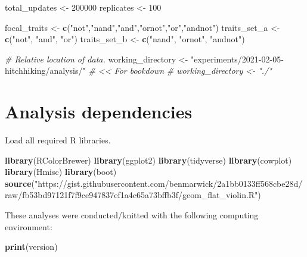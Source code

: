 \documentclass[]{book}
\newenvironment{Shaded}{\begin{snugshade}}{\end{snugshade}}
\newcommand{\CommentTok}[1]{\textcolor[rgb]{0.56,0.35,0.01}{\textit{#1}}}
\newcommand{\DecValTok}[1]{\textcolor[rgb]{0.00,0.00,0.81}{#1}}
\newcommand{\KeywordTok}[1]{\textcolor[rgb]{0.13,0.29,0.53}{\textbf{#1}}}
\newcommand{\NormalTok}[1]{#1}
\newcommand{\StringTok}[1]{\textcolor[rgb]{0.31,0.60,0.02}{#1}}
\begin{document}
\begin{Shaded}
\begin{Highlighting}[]
\NormalTok{total_updates <-}\StringTok{ }\DecValTok{200000}
\NormalTok{replicates <-}\StringTok{ }\DecValTok{100}

\NormalTok{focal_traits <-}\StringTok{ }\KeywordTok{c}\NormalTok{(}\StringTok{"not"}\NormalTok{,}\StringTok{"nand"}\NormalTok{,}\StringTok{"and"}\NormalTok{,}\StringTok{"ornot"}\NormalTok{,}\StringTok{"or"}\NormalTok{,}\StringTok{"andnot"}\NormalTok{)}
\NormalTok{traits_set_a <-}\StringTok{ }\KeywordTok{c}\NormalTok{(}\StringTok{"not"}\NormalTok{, }\StringTok{"and"}\NormalTok{, }\StringTok{"or"}\NormalTok{)}
\NormalTok{traits_set_b <-}\StringTok{ }\KeywordTok{c}\NormalTok{(}\StringTok{"nand"}\NormalTok{, }\StringTok{"ornot"}\NormalTok{, }\StringTok{"andnot"}\NormalTok{)}

\CommentTok{# Relative location of data.}
\NormalTok{working_directory <-}\StringTok{ "experiments/2021-02-05-hitchhiking/analysis/"} \CommentTok{# << For bookdown}
\CommentTok{# working_directory <- "./"}
\end{Highlighting}
\end{Shaded}

\hypertarget{analysis-dependencies-3}{%
\section{Analysis dependencies}\label{analysis-dependencies-3}}

Load all required R libraries.

\begin{Shaded}
\begin{Highlighting}[]
\KeywordTok{library}\NormalTok{(RColorBrewer)}
\KeywordTok{library}\NormalTok{(ggplot2)}
\KeywordTok{library}\NormalTok{(tidyverse)}
\KeywordTok{library}\NormalTok{(cowplot)}
\KeywordTok{library}\NormalTok{(Hmisc)}
\KeywordTok{library}\NormalTok{(boot)}
\KeywordTok{source}\NormalTok{(}\StringTok{"https://gist.githubusercontent.com/benmarwick/2a1bb0133ff568cbe28d/raw/fb53bd97121f7f9ce947837ef1a4c65a73bffb3f/geom_flat_violin.R"}\NormalTok{)}
\end{Highlighting}
\end{Shaded}

These analyses were conducted/knitted with the following computing environment:

\begin{Shaded}
\begin{Highlighting}[]
\KeywordTok{print}\NormalTok{(version)}
\end{Highlighting}
\end{Shaded}
\end{document}

